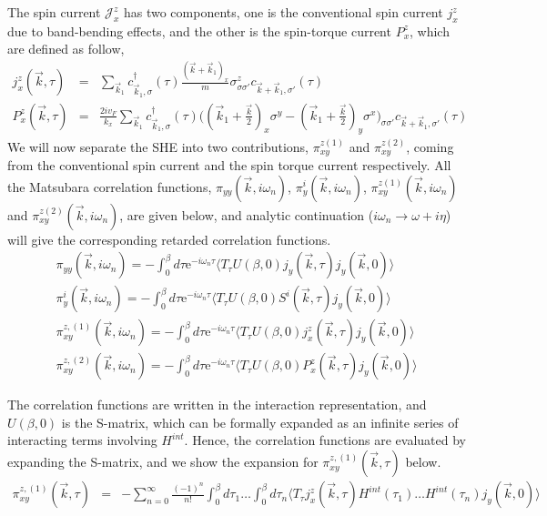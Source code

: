 \documentclass[letter,12pt,preprint,aps]{revtex4-1}
\newcommand{\ba}{\begin{eqnarray}}
\newcommand{\ea}{\end{eqnarray}}
\newcommand{\dg}{^{\dagger}}
\newcommand{\me}{\mathrm{e}}
\begin{document}
The spin current $\mathcal{J}^z_x$ has two components, one is the conventional spin current $j^z_x$ due to band-bending effects, and the other is the spin-torque current $P^z_x$, which are defined as follow,
%
\begin{subequations}
\ba
\label{eqn: spin current defns}
j^z_x(\vec{k}, \tau) & = & \sum_{\vec{k}_1} c\dg_{\vec{k}_1, \sigma}(\tau) \frac{(\vec{k} + \vec{k}_1)_x}{m} \sigma^z_{\sigma \sigma'} c_{\vec{k} + \vec{k}_1, \sigma'}(\tau) \\
P^z_x(\vec{k}, \tau) & = & \frac{2 i v_F}{k_x} \sum_{\vec{k}_1} c\dg_{\vec{k}_1, \sigma}(\tau) \Big( (\vec{k}_1 + \frac{\vec{k}}{2})_x \sigma^y - (\vec{k}_1 + \frac{\vec{k}}{2})_y \sigma^x\Big)_{\sigma \sigma'} c_{\vec{k} + \vec{k}_1, \sigma'}(\tau)
\ea
\end{subequations}
%
We will now separate the SHE into two contributions, $\pi^{z(1)}_{xy}$ and $\pi^{z(2)}_{xy}$, coming from the conventional spin current and the spin torque current respectively. All the Matsubara correlation functions, $\pi_{yy}(\vec{k}, i \omega_n)$, $\pi^{i}_{y}(\vec{k}, i \omega_n)$, $\pi^{z(1)}_{xy}(\vec{k}, i \omega_n)$ and $\pi^{z(2)}_{xy}(\vec{k}, i \omega_n)$, are given below, and analytic continuation ($i \omega_n \rightarrow \omega + i \eta$) will give the corresponding retarded correlation functions. 
%
\begin{subequations}
\label{eqn: Matsubara corr funcs}
\ba
\pi_{yy} (\vec{k}, i \omega_n) = - \int_0^{\beta} d \tau \me^{- i \omega_n \tau} \langle T_{\tau} U(\beta, 0) j_y(\vec{k}, \tau) j_y(\vec{k}, 0) \rangle \\
\pi^i_{y} (\vec{k}, i \omega_n) = - \int_0^{\beta} d \tau \me^{- i \omega_n \tau} \langle T_{\tau} U(\beta, 0) S^i(\vec{k}, \tau) j_y(\vec{k}, 0) \rangle \\
\pi^{z, (1)}_{xy} (\vec{k}, i \omega_n) = - \int_0^{\beta} d \tau \me^{- i \omega_n \tau} \langle T_{\tau} U(\beta, 0) j^z_x(\vec{k}, \tau) j_y(\vec{k}, 0) \rangle \\
\pi^{z, (2)}_{xy} (\vec{k}, i \omega_n) = - \int_0^{\beta} d \tau \me^{- i \omega_n \tau} \langle T_{\tau} U(\beta, 0) P^z_x(\vec{k}, \tau) j_y(\vec{k}, 0) \rangle
\ea
\end{subequations}

The correlation functions are written in the interaction representation, and $U(\beta, 0)$ is the S-matrix, which can be formally expanded as an infinite series of interacting terms involving $H^{int}$. Hence, the correlation functions are evaluated by expanding the S-matrix, and we show the expansion for $\pi^{z, (1)}_{xy}(\vec{k}, \tau)$ below.
%
\ba
\label{eqn: S matrix expansion}
\pi^{z,(1)}_{xy} (\vec{k}, \tau) & = & - \sum_{n=0}^{\infty} \frac{(-1)^n}{n!} \int_{0}^{\beta} d \tau_1 \ldots \int_{0}^{\beta} d \tau_n \langle T_{\tau} j^z_x(\vec{k}, \tau) H^{int}(\tau_1) \ldots H^{int}(\tau_n) j_y(\vec{k}, 0) \rangle
\ea
\end{document}

